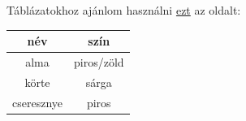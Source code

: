 Táblázatokhoz ajánlom használni \href{https://www.tablesgenerator.com}{ezt} az oldalt:

\begin{table}[H]
  \begin{tabular}{|c|c|}
    \hline
    név        & szín       \\ \hline
    alma       & piros/zöld \\ \hline
    körte      & sárga      \\ \hline
    cseresznye & piros      \\ \hline
  \end{tabular}
\end{table}
